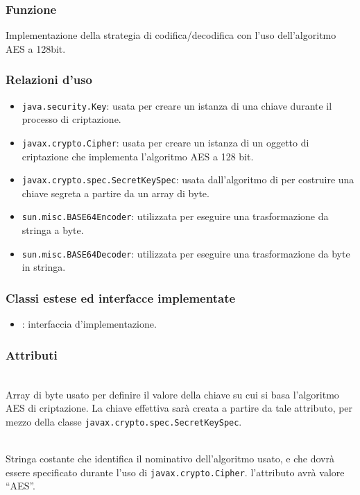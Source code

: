 
\subsubsection*{Funzione}
Implementazione della strategia di codifica/decodifica con l'uso dell'algoritmo AES a 128bit.

\subsubsection*{Relazioni d'uso}
\begin{itemize}
	\item \texttt{java.security.Key}: usata per creare un istanza di una chiave durante il processo di criptazione.
	\item \texttt{javax.crypto.Cipher}: usata per creare un istanza di un oggetto di criptazione che implementa l'algoritmo AES a 128 bit.
	\item \texttt{javax.crypto.spec.SecretKeySpec}: usata dall'algoritmo di per costruire una chiave segreta a partire da un array di byte.
	\item \texttt{sun.misc.BASE64Encoder}: utilizzata per eseguire una trasformazione da stringa a byte.
	\item \texttt{sun.misc.BASE64Decoder}: utilizzata per eseguire una trasformazione da byte in stringa.
\end{itemize}

\subsubsection*{Classi estese ed interfacce implementate}
\begin{itemize}
	\item {}: interfaccia d'implementazione.
\end{itemize}

\subsubsection*{Attributi}
\begin{description}
  \item{}\\
  Array di byte usato per definire il valore della chiave su cui si basa l'algoritmo AES di criptazione. La chiave effettiva sarà creata a partire da tale attributo, per mezzo della classe \texttt{javax.crypto.spec.SecretKeySpec}.
  \item{}\\
  Stringa costante che identifica il nominativo dell'algoritmo usato, e che dovrà essere specificato durante l'uso di \texttt{javax.crypto.Cipher}. l'attributo avrà valore ``AES''.
\end{description}


